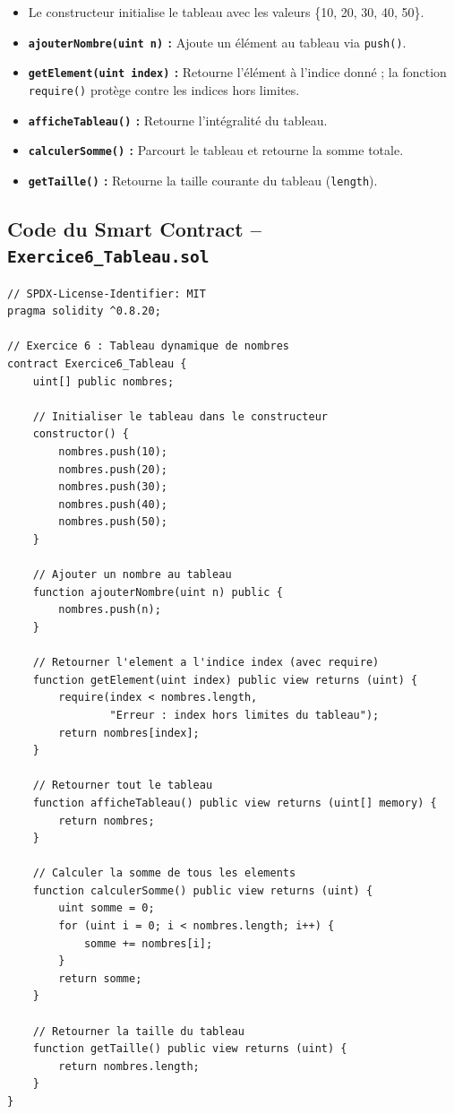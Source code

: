 \documentclass[12pt,a4paper]{report}
\begin{document}
\begin{itemize}
    \item Le constructeur initialise le tableau avec les valeurs \{10, 20, 30, 40, 50\}.
    \item \textbf{\texttt{ajouterNombre(uint n)} :} Ajoute un élément au tableau via \texttt{push()}.
    \item \textbf{\texttt{getElement(uint index)} :} Retourne l'élément à l'indice donné ;
          la fonction \texttt{require()} protège contre les indices hors limites.
    \item \textbf{\texttt{afficheTableau()} :} Retourne l'intégralité du tableau.
    \item \textbf{\texttt{calculerSomme()} :} Parcourt le tableau et retourne la somme totale.
    \item \textbf{\texttt{getTaille()} :} Retourne la taille courante du tableau (\texttt{length}).
\end{itemize}

\subsection{Code du Smart Contract -- \texttt{Exercice6\_Tableau.sol}}
\begin{lstlisting}[language=Solidity, caption={Contrat Tableau.sol -- tableaux dynamiques}]
// SPDX-License-Identifier: MIT
pragma solidity ^0.8.20;

// Exercice 6 : Tableau dynamique de nombres
contract Exercice6_Tableau {
    uint[] public nombres;

    // Initialiser le tableau dans le constructeur
    constructor() {
        nombres.push(10);
        nombres.push(20);
        nombres.push(30);
        nombres.push(40);
        nombres.push(50);
    }

    // Ajouter un nombre au tableau
    function ajouterNombre(uint n) public {
        nombres.push(n);
    }

    // Retourner l'element a l'indice index (avec require)
    function getElement(uint index) public view returns (uint) {
        require(index < nombres.length,
                "Erreur : index hors limites du tableau");
        return nombres[index];
    }

    // Retourner tout le tableau
    function afficheTableau() public view returns (uint[] memory) {
        return nombres;
    }

    // Calculer la somme de tous les elements
    function calculerSomme() public view returns (uint) {
        uint somme = 0;
        for (uint i = 0; i < nombres.length; i++) {
            somme += nombres[i];
        }
        return somme;
    }

    // Retourner la taille du tableau
    function getTaille() public view returns (uint) {
        return nombres.length;
    }
}
\end{lstlisting}
\end{document}
